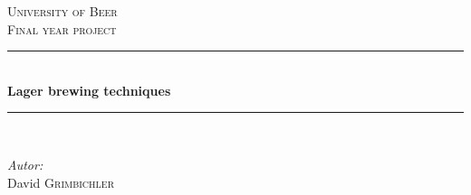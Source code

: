 \documentclass[a4paper, 11pt]{article}
\begin{document}
	


	\begin{titlepage}

		

		\begin{center}

			

			



			

			\textsc{\LARGE University of Beer}\\[1.5cm]

			

			\textsc{\Large Final year project}\\[0.5cm]

			

			


			\newcommand{\HRule}{\rule{\linewidth}{0.5mm}}

			\HRule \\[0.4cm]

			{ \huge \bfseries Lager brewing techniques}\\[0.4cm]

			

			\HRule \\[1.5cm]

			


			\begin{minipage}{0.4\textwidth}

				\begin{flushleft} \large

					\emph{Autor:}\\

					David \textsc{Grimbichler}

				\end{flushleft}

			\end{minipage}

			\hfill

			\begin{minipage}{0.4\textwidth}

				\begin{flushright} \large


\end{flushright}
\end{minipage}
\end{center}
\end{titlepage}
\end{document}

